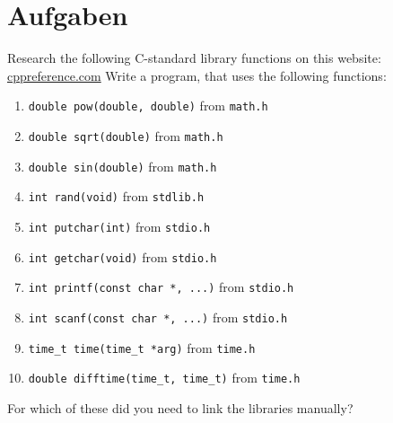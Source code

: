 \documentclass{dcbl/challenge}
\begin{document}
\section*{Aufgaben}
\begin{aufgabe}
    Research the following C-standard library functions on this website: \href{https://en.cppreference.com/w/c/header}{cppreference.com}
    Write a program, that uses the following functions:
    \begin{enumerate}
        \item \texttt{double pow(double, double)} from \texttt{math.h}
        \item \texttt{double sqrt(double)} from \texttt{math.h}
        \item \texttt{double sin(double)} from \texttt{math.h}
        \item \texttt{int rand(void)} from \texttt{stdlib.h}
        \item \texttt{int putchar(int)} from \texttt{stdio.h}
        \item \texttt{int getchar(void)} from \texttt{stdio.h}
        \item \texttt{int printf(const char *, ...)} from \texttt{stdio.h}
        \item \texttt{int scanf(const char *, ...)} from \texttt{stdio.h}
        \item \texttt{time\_t time(time\_t *arg)} from \texttt{time.h}
        \item \texttt{double difftime(time\_t, time\_t)} from \texttt{time.h}
    \end{enumerate}
    For which of these did you need to link the libraries manually?
\end{aufgabe}
\end{document}
